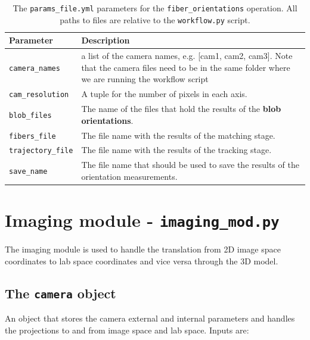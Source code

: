 \documentclass[10pt,a4paper]{article}
\begin{document}
%
\begin{table}[!ht]
	\centering
	\caption{The \texttt{params\_file.yml} parameters for the \texttt{fiber\_orientations} operation. All paths to files are relative to the \texttt{workflow.py} script. \label{tab:fibers}}
	\begin{tabular}{l m{10cm}}
		\hline
		Parameter & Description\\
		\hline
		\texttt{camera\_names} & a list of the camera names, e.g. [cam1, cam2, cam3]. Note that the camera files need to be in the same folder where we are running the workflow script\\[.3em]
		\texttt{cam\_resolution} & A tuple for the number of pixels in each axis. \\[.3em]
		\texttt{blob\_files} & The name of the files that hold the results of the \textbf{blob orientations}. \\[.3em]
		\texttt{fibers\_file} & The file name with the results of the matching stage. \\[.3em]
		\texttt{trajectory\_file} & The file name with the results of the tracking stage. \\[.3em]
		\texttt{save\_name} & The file name that should be used to save the results of the orientation measurements. \\[.3em]
		\hline
	\end{tabular}
\end{table}









\clearpage


\section{Imaging module - \texttt{imaging\_mod.py}}\label{sec:image_mod}


The imaging module is used to handle the translation from 2D image space coordinates to lab space coordinates and vice versa through the 3D model. 



\subsection{The \texttt{camera} object}\label{sec:camera}

An object that stores the camera external and internal parameters and handles the projections to and from image space and lab space. Inputs are:
\end{document}
